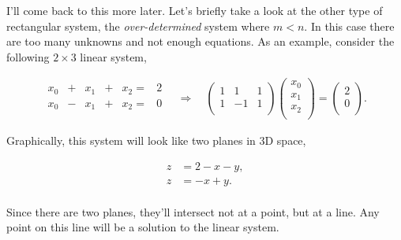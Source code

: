 \documentclass[
  letterpaper,
  DIV=11,
  numbers=noendperiod]{scrreprt}
\begin{document}
I'll come back to this more later. Let's briefly take a look at the
other type of rectangular system, the \emph{over-determined} system
where \(m < n\). In this case there are too many unknowns and not enough
equations. As an example, consider the following \(2 \times 3\) linear
system,

\begin{gather*}
\begin{alignedat}{3}
   x_0 & {}+{} &  x_1 & {}+{} & x_2 {}={} & 2  \\
   x_0 & {}-{} &  x_1 & {}+{} & x_2 {}={} & 0 \\
\end{alignedat}
\quad \Longrightarrow \quad
\begin{pmatrix}
1 & 1 & 1 \\
1 & -1 & 1 \\
\end{pmatrix}
\begin{pmatrix}
x_0 \\
x_1 \\
x_2 \\
\end{pmatrix} = 
\begin{pmatrix}
2 \\
0 \\
\end{pmatrix}.
\end{gather*}

Graphically, this system will look like two planes in 3D space,

\begin{align*}
z &= 2 - x - y, \\
z &= -x + y. \\
\end{align*}

Since there are two planes, they'll intersect not at a point, but at a
line. Any point on this line will be a solution to the linear system.
\end{document}
